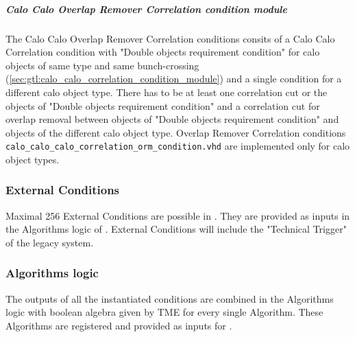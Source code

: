 
\subparagraph{Calo Calo Overlap Remover Correlation condition module}
\label{sec:gtl:calo_calo_overlao_remover_condition_module}

The Calo Calo Overlap Remover Correlation conditions consits of a Calo Calo Correlation condition with "Double objects requirement condition" for calo objects of same type and same bunch-crossing (\ref{sec:gtl:calo_calo_correlation_condition_module}) and a single condition for a different calo object type. There has to be at least one correlation cut or the objects of "Double objects requirement condition" and a correlation cut for overlap removal between objects
of "Double objects requirement condition" and objects of the different calo object type.
Overlap Remover Correlation conditions \texttt{calo\_calo\_calo\_correlation\_orm\_condition.vhd} are implemented only for calo object types.

% 

\subsubsection{External Conditions}
\label{sec:gtl:external_conditions}
Maximal 256 External Conditions are possible in \gt. They are provided as inputs in the Algorithms logic of \ugtl.
External Conditions will include the "Technical Trigger" of the legacy system.

\subsubsection{Algorithms logic}
\label{sec:gtl:algorithms_logic}

The outputs of all the instantiated conditions are combined in the Algorithms logic with boolean algebra given by TME for every single Algorithm. These Algorithms are registered and provided
as inputs for \fdl.

\clearpage


